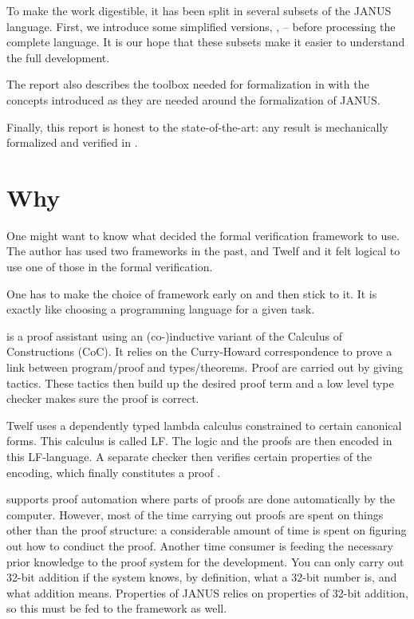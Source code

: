 To make the work digestible, it has been split in several subsets of
the JANUS language. First, we introduce some simplified versions,
\janusz{}, \januso{} -- before processing the complete language. It is
our hope that these subsets make it easier to understand the full
development.

The report also describes the toolbox needed for formalization in
\coq{} with the concepts introduced as they are needed around the
formalization of JANUS.

Finally, this report is honest to the state-of-the-art: any result is
mechanically formalized and verified in \coq{}.

\section{Why \coq{}}

One might want to know what decided the formal verification framework
to use. The author has used two frameworks in the past, \coq{} and Twelf
and it felt logical to use one of those in the formal verification.

One has to make the choice of framework early on and then stick to
it. It is exactly like choosing a programming language for a given
task.

\coq{} is a proof assistant using an (co-)inductive variant of the
Calculus of Constructions (CoC). It relies on the Curry-Howard
correspondence to prove a link between program/proof and
types/theorems. Proof are carried out by giving tactics. These tactics
then build up the desired proof term and a low level type checker
makes sure the proof is correct.

Twelf uses a dependently typed lambda calculus constrained to certain
canonical forms. This calculus is called LF. The logic and the proofs
are then encoded in this LF-language. A separate checker then verifies
certain properties of the encoding, which finally constitutes a proof
.

\coq{} supports proof automation where parts of proofs are done
automatically by the computer. However, most of the time carrying out
proofs are spent on things other than the proof structure: a
considerable amount of time is spent on figuring out how to condiuct
the proof. Another time consumer is feeding the necessary prior
knowledge to the proof system for the development. You can only carry
out 32-bit addition if the system knows, by definition, what a 32-bit
number is, and what addition means. Properties of JANUS relies on
properties of 32-bit addition, so this must be fed to the framework as
well.


